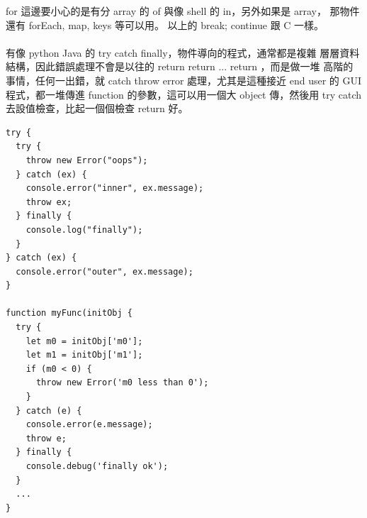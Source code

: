   for 這邊要小心的是有分 array 的 of 與像 shell 的 in，另外如果是 array，
  那物件還有 forEach, map, keys 等可以用。 以上的 break; continue 跟 C 一樣。
  \\\\
  有像 python Java 的 try catch finally，物件導向的程式，通常都是複雜
  層層資料結構，因此錯誤處理不會是以往的 return return ... return ，而是做一堆
  高階的事情，任何一出錯，就 catch throw error 處理，尤其是這種接近 end user
  的 GUI 程式，都一堆傳進 function 的參數，這可以用一個大 object 傳，然後用
  try catch 去設值檢查，比起一個個檢查 return 好。
  \begin{verbatim}
try {
  try {
    throw new Error("oops");
  } catch (ex) {
    console.error("inner", ex.message);
    throw ex;
  } finally {
    console.log("finally");
  }
} catch (ex) {
  console.error("outer", ex.message);
}

function myFunc(initObj {
  try {
    let m0 = initObj['m0'];
    let m1 = initObj['m1'];
    if (m0 < 0) {
      throw new Error('m0 less than 0');
    }
  } catch (e) {
    console.error(e.message);
    throw e;
  } finally {
    console.debug('finally ok');
  }
  ...
}
  \end{verbatim}

